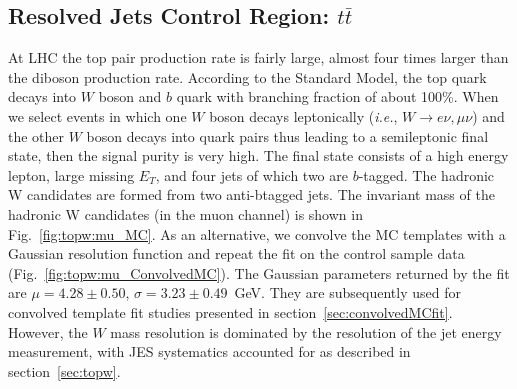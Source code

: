 \subsection{Resolved Jets Control Region: $t\bar{t}$}
\label{sec:ttbar_resulved}

At LHC the top pair production rate is fairly large, almost four times larger than the diboson production
rate. According to the Standard Model, the top quark decays into $W$
boson and $b$ quark with branching fraction of about 100\%. When we
select events in which one $W$ boson decays leptonically
(\textit{i.e.}, $W\to e\nu, \mu\nu$) and the other $W$ boson decays
into quark pairs thus leading to a semileptonic final state, then the
signal purity is very high.  The final state consists of a high energy
lepton, large missing $E_T$, and four jets of which two are
$b$-tagged. The hadronic W candidates are formed from two anti-btagged
jets.  The invariant mass of the hadronic W candidates (in the muon channel) is shown in
Fig.~\ref{fig:topw:mu_MC}. As an alternative, we convolve the MC templates with a Gaussian resolution function and
repeat the fit on the control sample data (Fig.~\ref{fig:topw:mu_ConvolvedMC}). The Gaussian parameters returned by the fit are $\mu=4.28\pm 0.50$, $\sigma=3.23\pm 0.49$~GeV. They are subsequently used for convolved template fit studies presented in section~\ref{sec:convolvedMCfit}. However, the $W$ mass resolution is dominated by the resolution of the 
jet energy measurement, with JES systematics accounted for as described in section~\ref{sec:topw}.
